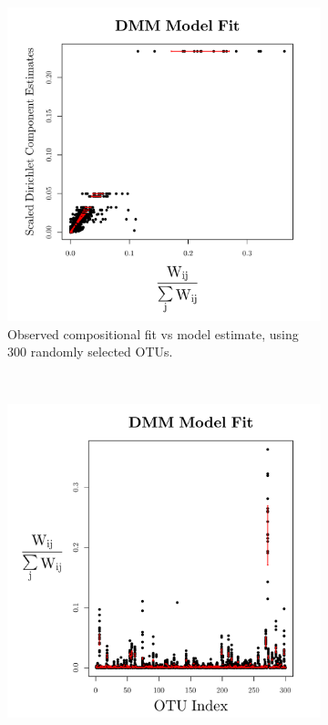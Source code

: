 \documentclass{template}
\begin{document}
\begin{figure}[ht!]
    \centering
    \begin{subfigure}[b]{0.36\textheight}
        \includegraphics[width=\textwidth]{Images/DMM300.pdf}
        \caption{Observed compositional fit vs model estimate, using 300 randomly selected OTUs.}
    \end{subfigure}
\\
    \begin{subfigure}[b]{0.36\textheight}
        \includegraphics[width=\textwidth]{Images/DMM300T.pdf}

\end{subfigure}
\end{figure}
\end{document}
